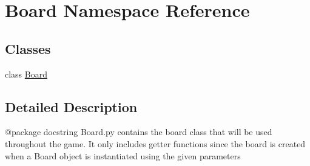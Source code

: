 \hypertarget{namespace_board}{}\section{Board Namespace Reference}
\label{namespace_board}
\subsection*{Classes}
\begin{DoxyCompactItemize}
\item 
class \mbox{\hyperlink{class_board_1_1_board}{Board}}
\end{DoxyCompactItemize}


\subsection{Detailed Description}
\begin{DoxyVerb}@package docstring
   Board.py contains the board class that will be used throughout the game. It
   only includes getter functions since the board is created when a Board object
   is instantiated using the given parameters
\end{DoxyVerb}
 